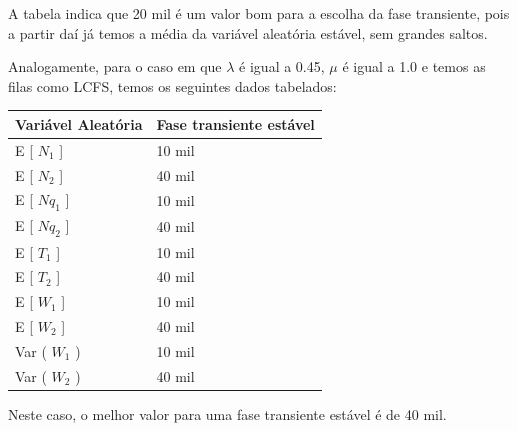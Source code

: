 \documentclass[a4paper,10pt]{article}
\begin{document}
    A tabela indica que 20 mil é um valor bom para a escolha da fase transiente, pois a partir daí já temos a média da variável aleatória estável, sem grandes saltos.

    Analogamente, para o caso em que $\lambda$ é igual a 0.45, $\mu$ é igual a 1.0 e temos as filas como LCFS, temos os seguintes dados tabelados:

\begin{center}
\begin{tabular} { | l | l | }
    \hline
    Variável Aleatória  & Fase transiente estável \\ \hline
    E [ $N_1$ ]         & 10 mil \\ \hline
    E [ $N_2$ ]         & 40 mil \\ \hline
    E [ $Nq_1$ ]        & 10 mil \\ \hline
    E [ $Nq_2$ ]	    & 40 mil \\ \hline
    E [ $T_1$ ]         & 10 mil \\ \hline
    E [ $T_2$ ]         & 40 mil \\ \hline
    E [ $W_1$ ]         & 10 mil \\ \hline
    E [ $W_2$ ]         & 40 mil \\ \hline
    Var ( $W_1$ )       & 10 mil \\ \hline
    Var ( $W_2$ )       & 40 mil \\ \hline
\end{tabular}
\end{center}

    Neste caso, o melhor valor para uma fase transiente estável é de 40 mil.
\end{document}
